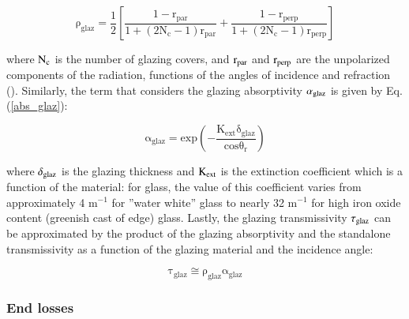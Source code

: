 \begin{equation}
	\mathrm{\rho_{glaz} = \frac{1}{2}\left[\frac{1 - r_{par}}{1 + (2N_c - 1)r_{par}} + \frac{1 - r_{perp}}{1 + (2N_c - 1)r_{perp}}\right]}
	\label{rho_glaz}
\end{equation}

\noindent where $\rm{N_c}$ is the number of glazing covers, and $\rm{r_{par}}$ and $\rm{r_{perp}}$ are the unpolarized components of the radiation, functions of the angles of incidence and refraction (\cite{Duffie2013}). Similarly, the term that considers the glazing absorptivity $\rm{\alpha_{glaz}}$ is given by Eq. (\ref{abs_glaz}):

\begin{equation}
	\mathrm{\alpha_{glaz} = exp\left(-\frac{K_{ext}\delta_{glaz}}{cos\theta_r} \right) }
	\label{abs_glaz}
\end{equation}

\noindent where $\rm{\delta_{glaz}}$ is the glazing thickness and $\rm{K_{ext}}$ is the extinction coefficient which is a function of the material: for glass, the value of this coefficient varies from approximately 4 m$^{-1}$ for ''water white'' glass to nearly 32 m$^{-1}$ for high iron oxide content (greenish cast of edge) glass. Lastly, the glazing transmissivity $\rm{\tau_{glaz}}$ can be approximated by the product of the glazing absorptivity and the standalone transmissivity as a function of the glazing material and the incidence angle:

\begin{equation}
	\mathrm{\tau_{glaz} \cong \rho_{glaz}\alpha_{glaz}}
	\label{transmi}
\end{equation}



\subsubsection{End losses}


